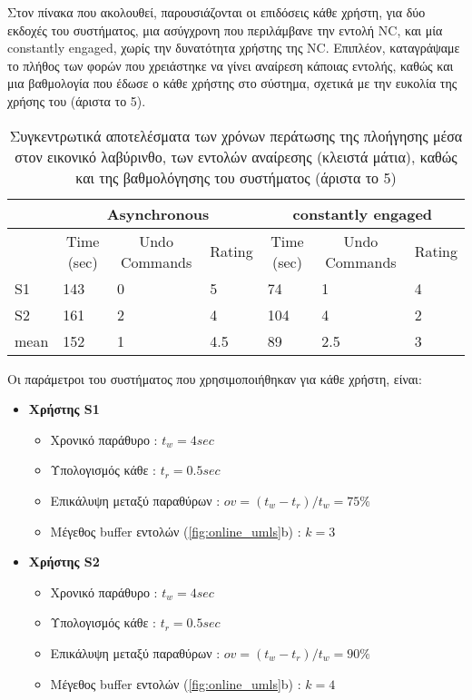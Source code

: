 \documentclass[11pt,a4paper,english,greek,twoside]{../Thesis}
\begin{document}
\par Στον πίνακα που ακολουθεί, παρουσιάζονται οι επιδόσεις κάθε χρήστη, για δύο εκδοχές του συστήματος, μια ασύγχρονη που περιλάμβανε την εντολή NC, και μία constantly engaged, χωρίς την δυνατότητα χρήστης της NC. Επιπλέον, καταγράψαμε το πλήθος των φορών που χρειάστηκε να γίνει αναίρεση κάποιας εντολής, καθώς και μια βαθμολογία που έδωσε ο κάθε χρήστης στο σύστημα, σχετικά με την ευκολία της χρήσης του (άριστα το 5).
\begin{table}[H]
    \centering
    \begin{tabular}{ |p{1cm}||p{1cm}|p{1cm}|p{1cm}|p{1cm}|p{1cm}|p{1cm}|}
        \hline
        & \multicolumn{3}{c|}{Asynchronous} & \multicolumn{3}{c|}{constantly engaged} \\
        \hline
        & \multicolumn{1}{c|}{Time (sec)} & \multicolumn{1}{c|}{Undo Commands} & \multicolumn{1}{c|}{Rating} & \multicolumn{1}{c|}{Time (sec)} & \multicolumn{1}{c|}{Undo Commands} &
        \multicolumn{1}{c|}{Rating} \\
        \hline
        S1          & 143& 0& 5& 74& 1& 4 \\
        S2          & 161& 2& 4& 104& 4& 2 \\
        \hline
        mean        & 152& 1& 4.5& 89& 2.5& 3\\
        \hline
    \end{tabular}
    \caption{Συγκεντρωτικά αποτελέσματα των χρόνων περάτωσης της πλοήγησης μέσα στον εικονικό λαβύρινθο, των εντολών αναίρεσης (κλειστά μάτια), καθώς και της βαθμολόγησης του συστήματος (άριστα το 5)}
    \label{tab:online}
\end{table}
\par Οι παράμετροι του συστήματος που χρησιμοποιήθηκαν για κάθε χρήστη, είναι:
\begin{itemize}
    \item \textbf{Χρήστης S1}
    \begin{itemize}
        \item Χρονικό παράθυρο : $t_w=4sec$
        \item Υπολογισμός κάθε : $t_r=0.5sec$
        \item Επικάλυψη μεταξύ παραθύρων : $ov = (t_w-t_r)/t_w=75\%$
        \item Μέγεθος buffer εντολών (\ref{fig:online_umls}b) : $k=3$
    \end{itemize}
    \item \textbf{Χρήστης S2}
    \begin{itemize}
        \item Χρονικό παράθυρο : $t_w=4sec$
        \item Υπολογισμός κάθε : $t_r=0.5sec$
        \item Επικάλυψη μεταξύ παραθύρων : $ov = (t_w-t_r)/t_w=90\%$
        \item Μέγεθος buffer εντολών (\ref{fig:online_umls}b) : $k=4$
    \end{itemize}
\end{itemize}
\end{document}

